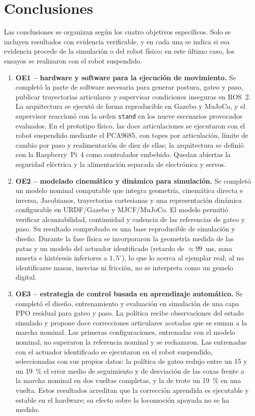 \chapter{Conclusiones}

Las conclusiones se organizan según los cuatro objetivos específicos. Solo se
incluyen resultados con evidencia verificable, y en cada una se indica si esa
evidencia procede de la simulación o del robot físico; en este último caso, los
ensayos se realizaron con el robot suspendido.

\begin{enumerate}
\item \textbf{OE1 -- hardware y software para la ejecución de movimiento.}
Se completó la parte de software necesaria para generar postura, gateo y paso,
publicar trayectorias articulares y supervisar condiciones inseguras en ROS~2.
La arquitectura se ejecutó de forma reproducible en Gazebo y MuJoCo, y el
supervisor reaccionó con la orden \texttt{stand} en los nueve escenarios
provocados evaluados. En el prototipo físico, las doce articulaciones se ejecutaron con
el robot suspendido mediante el PCA9685, con topes por articulación, límite de
cambio por paso y realimentación de diez de ellas; la arquitectura se definió
con la Raspberry~Pi~4 como controlador embebido. Quedan abiertas la seguridad
eléctrica y la alimentación separada de electrónica y servos.

\item \textbf{OE2 -- modelado cinemático y dinámico para simulación.}
Se completó un modelo nominal computable que integra geometría, cinemática
directa e inversa, Jacobianos, trayectorias cartesianas y una representación
dinámica configurable en URDF/Gazebo y MJCF/MuJoCo. El modelo permitió verificar
alcanzabilidad, continuidad y cadencia de las referencias de gateo y paso. Su
resultado comprobado es una base reproducible de simulación y diseño. Durante la
fase física se incorporaron la geometría medida de las patas y un modelo del
actuador identificado (retardo de $\approx99$~ms, zona muerta e histéresis
inferiores a $1{,}5^\circ$), lo que lo acerca al ejemplar real; al no
identificarse masas, inercias ni fricción, no se interpreta como un gemelo
digital.

\item \textbf{OE3 -- estrategia de control basada en aprendizaje automático.}
Se completó el diseño, entrenamiento y evaluación en simulación de una capa PPO
residual para gateo y paso. La política recibe observaciones del estado
simulado y propone doce correcciones articulares acotadas que se suman a la
marcha nominal. Las primeras configuraciones, entrenadas con el modelo nominal,
no superaron la referencia nominal y se rechazaron. Las entrenadas con el
actuador identificado se ejecutaron en el robot suspendido, seleccionadas con
sus propios datos: la política de gateo redujo entre un 15 y un 19~\% el error
medio de seguimiento y de desviación de las coxas frente a la marcha nominal en
dos vueltas completas, y la de trote un 19~\% en una vuelta. Estos resultados
acreditan que la corrección aprendida es ejecutable y estable en el hardware;
su efecto sobre la locomoción apoyada no se ha medido.


\end{enumerate}
